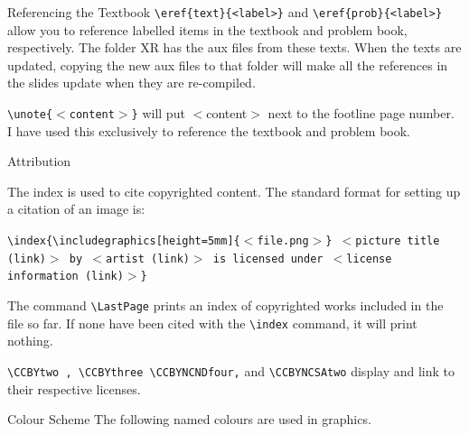 \documentclass[10pt]{beamer}
\begin{document}
\begin{frame}[fragile]{Referencing the Textbook}
\verb|\eref{text}{<label>}| and \verb|\eref{prob}{<label>}| allow you to reference labelled items in the textbook and problem book, respectively. The folder XR has the aux files from these texts. When the texts are updated, copying the new aux files to that folder will make all the references in the slides update when they are re-compiled.
\vfill

\texttt{\textbackslash unote\{$<$content$>$\}} will put $<$content$>$ next to the footline page number. I have used this exclusively to reference the textbook and problem book.
\end{frame}

\begin{frame}[t]{Attribution}

The index is used to cite copyrighted content. The standard format for setting up a citation of an image is:


\texttt{\footnotesize\textbackslash index\{\textbackslash includegraphics[height=5mm]\{$<$file.png$>$\} $<$picture title (link)$>$ by $<$artist (link)$>$ is licensed under $<$license information (link)$>$\}
}

\vfill

The command \texttt{\textbackslash LastPage} prints an index of copyrighted works included in the file so far. If none have been cited with the \texttt{\textbackslash index} command, it will print nothing.\vfill

\texttt{\textbackslash  CCBYtwo , \textbackslash CCBYthree \textbackslash  CCBYNCNDfour,} and \texttt{\textbackslash CCBYNCSAtwo} display and link to their respective licenses.
\end{frame}

\begin{frame}{Colour Scheme}
The following named colours are used in graphics. \vfill
{}

\end{frame}
\LastPage
\end{document}
